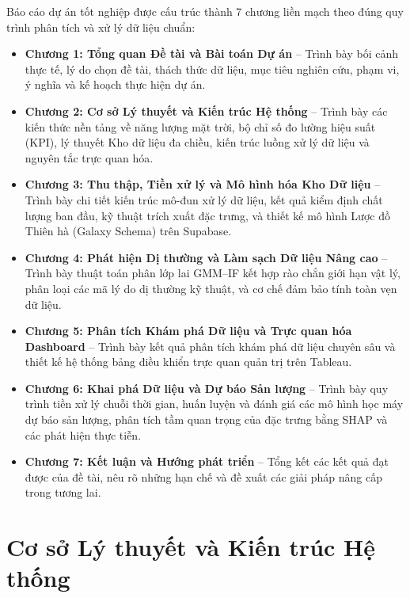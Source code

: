 \documentclass[12pt, a4paper]{report}
\begin{document}
Báo cáo dự án tốt nghiệp được cấu trúc thành 7 chương liền mạch theo đúng quy trình phân tích và xử lý dữ liệu chuẩn:
\begin{itemize}[noitemsep]
    \item \textbf{Chương 1: Tổng quan Đề tài và Bài toán Dự án} -- Trình bày bối cảnh thực tế, lý do chọn đề tài, thách thức dữ liệu, mục tiêu nghiên cứu, phạm vi, ý nghĩa và kế hoạch thực hiện dự án.
    \item \textbf{Chương 2: Cơ sở Lý thuyết và Kiến trúc Hệ thống} -- Trình bày các kiến thức nền tảng về năng lượng mặt trời, bộ chỉ số đo lường hiệu suất (KPI), lý thuyết Kho dữ liệu đa chiều, kiến trúc luồng xử lý dữ liệu và nguyên tắc trực quan hóa.
    \item \textbf{Chương 3: Thu thập, Tiền xử lý và Mô hình hóa Kho Dữ liệu} -- Trình bày chi tiết kiến trúc mô-đun xử lý dữ liệu, kết quả kiểm định chất lượng ban đầu, kỹ thuật trích xuất đặc trưng, và thiết kế mô hình Lược đồ Thiên hà (Galaxy Schema) trên Supabase.
    \item \textbf{Chương 4: Phát hiện Dị thường và Làm sạch Dữ liệu Nâng cao} -- Trình bày thuật toán phân lớp lai GMM--IF kết hợp rào chắn giới hạn vật lý, phân loại các mã lý do dị thường kỹ thuật, và cơ chế đảm bảo tính toàn vẹn dữ liệu.
    \item \textbf{Chương 5: Phân tích Khám phá Dữ liệu và Trực quan hóa Dashboard} -- Trình bày kết quả phân tích khám phá dữ liệu chuyên sâu và thiết kế hệ thống bảng điều khiển trực quan quản trị trên Tableau.
    \item \textbf{Chương 6: Khai phá Dữ liệu và Dự báo Sản lượng} -- Trình bày quy trình tiền xử lý chuỗi thời gian, huấn luyện và đánh giá các mô hình học máy dự báo sản lượng, phân tích tầm quan trọng của đặc trưng bằng SHAP và các phát hiện thực tiễn.
    \item \textbf{Chương 7: Kết luận và Hướng phát triển} -- Tổng kết các kết quả đạt được của đề tài, nêu rõ những hạn chế và đề xuất các giải pháp nâng cấp trong tương lai.
\end{itemize}

\chapter{Cơ sở Lý thuyết và Kiến trúc Hệ thống}
\label{chap:lythuyet}
\end{document}
